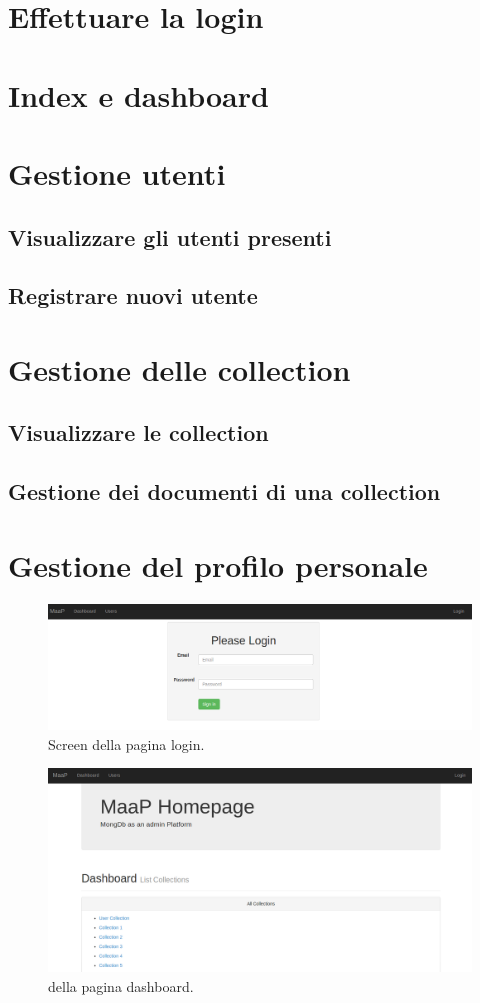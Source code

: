 \section{Effettuare la login}
\section{Index e dashboard}
\section{Gestione utenti}
\subsection{Visualizzare gli utenti presenti}
\subsection{Registrare nuovi utente}
\section{Gestione delle collection}
\subsection{Visualizzare le collection}
\subsection{Gestione dei documenti di una collection}
\section{Gestione del profilo personale}
\begin{figure}[h]
	\centering \includegraphics[width=1\textwidth]{login.png}
	\caption{Screen della pagina login.}
\end{figure}

\begin{figure}[h]
	\centering \includegraphics[width=1\textwidth]{dashboard.png}
	\caption{della pagina dashboard. }
\end{figure}

